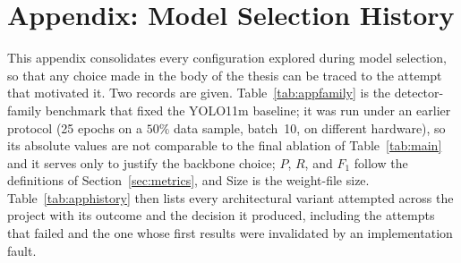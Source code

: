 \documentclass[12pt,a4paper,oneside]{report}
\begin{document}




\tableofcontents

\clearpage
{}
\begingroup\setlength{\parskip}{1pt}\listoftables\endgroup

\clearpage
{}
\begingroup\setlength{\parskip}{1pt}\listoffigures\endgroup



\clearpage
{}










\clearpage
\appendix
{}
{}
\chapter*{Appendix: Model Selection History}
\renewcommand{\thetable}{A.\arabic{table}}
\renewcommand{\thefigure}{A.\arabic{figure}}
\setcounter{table}{0}
\setcounter{figure}{0}
This appendix consolidates every configuration explored during model
selection, so that any choice made in the body of the thesis can be traced
to the attempt that motivated it. Two records are given. Table~\ref{tab:appfamily}
is the detector-family benchmark that fixed the YOLO11m baseline; it was run
under an earlier protocol (25 epochs on a $50\%$ data sample, batch~10, on
different hardware), so its absolute values are not comparable to the final
ablation of Table~\ref{tab:main} and
it serves only to justify the backbone choice; $P$, $R$, and $F_1$ follow
the definitions of Section~\ref{sec:metrics}, and Size is the weight-file
size. Table~\ref{tab:apphistory}
then lists every architectural variant attempted across the project with its
outcome and the decision it produced, including the attempts that failed and
the one whose first results were invalidated by an implementation fault.
\end{document}

